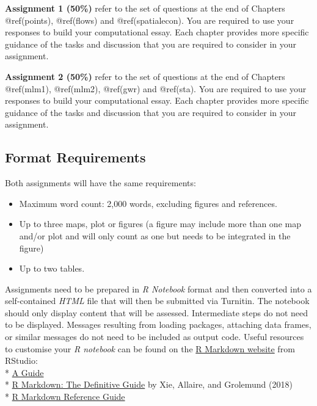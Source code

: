 \documentclass[
  letterpaper,
  DIV=11,
  numbers=noendperiod]{scrreprt}
\providecommand{\tightlist}{%
  \setlength{\itemsep}{0pt}\setlength{\parskip}{0pt}}\usepackage{longtable,booktabs,array}
\begin{document}
\textbf{Assignment 1 (50\%)} refer to the set of questions at the end of
Chapters @ref(points), @ref(flows) and @ref(spatialecon). You are
required to use your responses to build your computational essay. Each
chapter provides more specific guidance of the tasks and discussion that
you are required to consider in your assignment.

\textbf{Assignment 2 (50\%)} refer to the set of questions at the end of
Chapters @ref(mlm1), @ref(mlm2), @ref(gwr) and @ref(sta). You are
required to use your responses to build your computational essay. Each
chapter provides more specific guidance of the tasks and discussion that
you are required to consider in your assignment.

\hypertarget{format-requirements}{%
\subsection{Format Requirements}\label{format-requirements}}

Both assignments will have the same requirements:

\begin{itemize}
\tightlist
\item
  Maximum word count: 2,000 words, excluding figures and references.
\item
  Up to three maps, plot or figures (a figure may include more than one
  map and/or plot and will only count as one but needs to be integrated
  in the figure)
\item
  Up to two tables.
\end{itemize}

Assignments need to be prepared in \emph{R Notebook} format and then
converted into a self-contained \emph{HTML} file that will then be
submitted via Turnitin. The notebook should only display content that
will be assessed. Intermediate steps do not need to be displayed.
Messages resulting from loading packages, attaching data frames, or
similar messages do not need to be included as output code. Useful
resources to customise your \emph{R notebook} can be found on the
\href{https://rmarkdown.rstudio.com}{R Markdown website} from RStudio:\\
* \href{https://rmarkdown.rstudio.com/lesson-1.html}{A Guide}\\
* \href{https://bookdown.org/yihui/rmarkdown/}{R Markdown: The
Definitive Guide} by Xie, Allaire, and Grolemund (2018)\\
*
\href{https://rstudio.com/wp-content/uploads/2015/03/rmarkdown-reference.pdf?_ga=2.199646894.1496049738.1611760832-141828105.1610798362}{R
Markdown Reference Guide}
\end{document}
